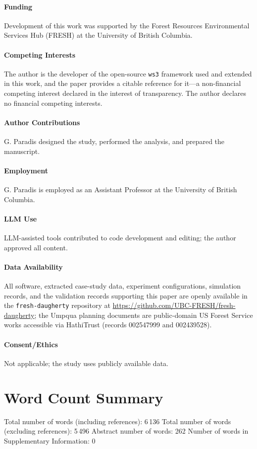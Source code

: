 \documentclass[12pt]{article}
\begin{document}
\paragraph{Funding} Development of this work was supported by the Forest Resources Environmental Services Hub (FRESH) at the University of British Columbia.
\paragraph{Competing Interests} The author is the developer of the open-source \texttt{ws3} framework used and extended in this work, and the paper provides a citable reference for it---a non-financial competing interest declared in the interest of transparency. The author declares no financial competing interests.
\paragraph{Author Contributions} G. Paradis designed the study, performed the analysis, and prepared the manuscript.
\paragraph{Employment} G. Paradis is employed as an Assistant Professor at the University of British Columbia.
\paragraph{LLM Use} LLM-assisted tools contributed to code development and editing; the author approved all content.
\paragraph{Data Availability} All software, extracted case-study data, experiment configurations, simulation records, and the validation records supporting this paper are openly available in the \texttt{fresh-daugherty} repository at \url{https://github.com/UBC-FRESH/fresh-daugherty}; the Umpqua planning documents are public-domain US Forest Service works accessible via HathiTrust (records 002547999 and 002439528).
\paragraph{Consent/Ethics} Not applicable; the study uses publicly available data.

\section*{Word Count Summary}
Total number of words (including references): 6\,136
Total number of words (excluding references): 5\,496
Abstract number of words: 262
Number of words in Supplementary Information: 0



\end{document}
